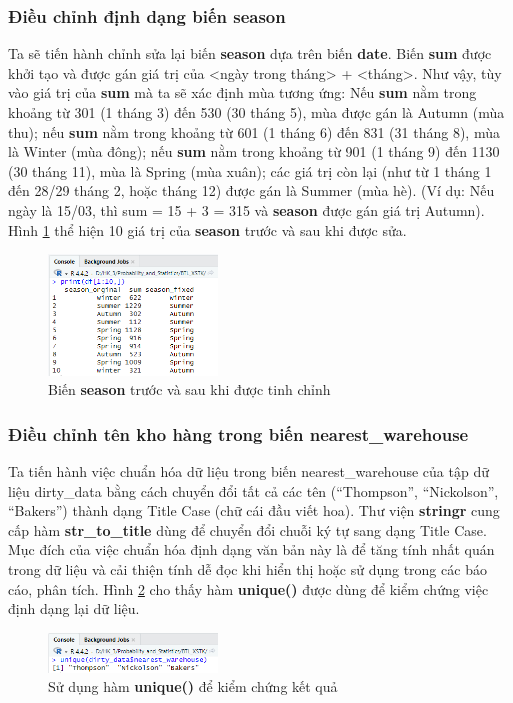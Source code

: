 \subsubsection{Điều chỉnh định dạng biến season}
Ta sẽ tiến hành chỉnh sửa lại biến \textbf{season} dựa trên biến \textbf{date}. Biến \textbf{sum} được khởi tạo và được gán giá trị của <ngày trong tháng> + <tháng>. Như vậy, tùy vào giá trị của \textbf{sum} mà ta sẽ xác định mùa tương ứng: Nếu \textbf{sum} nằm trong khoảng từ 301 (1 tháng 3) đến 530 (30 tháng 5), mùa được gán là Autumn (mùa thu); nếu \textbf{sum} nằm trong khoảng từ 601 (1 tháng 6) đến 831 (31 tháng 8), mùa là Winter (mùa đông); nếu \textbf{sum} nằm trong khoảng từ 901 (1 tháng 9) đến 1130 (30 tháng 11), mùa là Spring (mùa xuân); các giá trị còn lại (như từ 1 tháng 1 đến 28/29 tháng 2, hoặc tháng 12) được gán là Summer (mùa hè). (Ví dụ: Nếu ngày là 15/03, thì sum = 15 + 3  = 315 và \textbf{season} được gán giá trị Autumn). Hình \ref{f3} thể hiện 10 giá trị của \textbf{season} trước và sau khi được sửa.
\begin{figure}[!htbp]
    \centering
    \includegraphics[width=0.4\textwidth]{graphics/Pre_processing_data/f3.PNG}
    \caption{Biến \textbf{season} trước và sau khi được tinh chỉnh}
    \label{f3}
\end{figure}

\subsubsection{Điều chỉnh tên kho hàng trong biến nearest\_warehouse}

Ta tiến hành việc chuẩn hóa dữ liệu trong biến nearest\_warehouse của tập dữ liệu dirty\_data bằng cách chuyển đổi tất cả các tên (``Thompson'', ``Nickolson'',  ``Bakers'') thành dạng Title Case (chữ cái đầu viết hoa). Thư viện \textbf{stringr} cung cấp hàm \textbf{str\_to\_title} dùng để chuyển đổi chuỗi ký tự sang dạng Title Case. Mục đích của việc chuẩn hóa định dạng văn bản này là để tăng tính nhất quán trong dữ liệu và cải thiện tính dễ đọc khi hiển thị hoặc sử dụng trong các báo cáo, phân tích. Hình \ref{f4} cho thấy hàm \textbf{unique()} được dùng để kiểm chứng việc định dạng lại dữ liệu.
\begin{figure}[!htbp]
    \centering
    \includegraphics[width=0.4\textwidth]{graphics/Pre_processing_data/f4.PNG}
    \caption{Sử dụng hàm \textbf{unique()} để kiểm chứng kết quả}
    \label{f4}
\end{figure}

